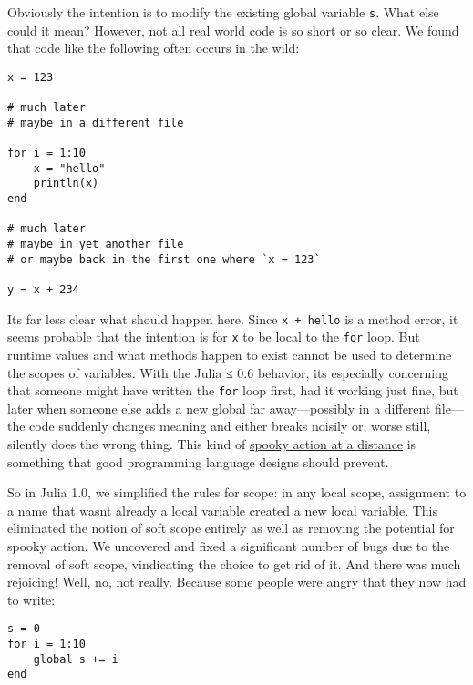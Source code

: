 Obviously the intention is to modify the existing global variable \texttt{s}. What else could it mean? However, not all real world code is so short or so clear. We found that code like the following often occurs in the wild:




\begin{verbatim}
x = 123

# much later
# maybe in a different file

for i = 1:10
    x = "hello"
    println(x)
end

# much later
# maybe in yet another file
# or maybe back in the first one where `x = 123`

y = x + 234
\end{verbatim}



It{\textquotesingle}s far less clear what should happen here. Since \texttt{x + {\textquotedbl}hello{\textquotedbl}} is a method error, it seems probable that the intention is for \texttt{x} to be local to the \texttt{for} loop. But runtime values and what methods happen to exist cannot be used to determine the scopes of variables. With the Julia ≤ 0.6 behavior, it{\textquotesingle}s especially concerning that someone might have written the \texttt{for} loop first, had it working just fine, but later when someone else adds a new global far away—possibly in a different file—the code suddenly changes meaning and either breaks noisily or, worse still, silently does the wrong thing. This kind of \href{https://en.wikipedia.org/wiki/Action\_at\_a\_distance\_(computer\_programming)}{{\textquotedbl}spooky action at a distance{\textquotedbl}} is something that good programming language designs should prevent.



So in Julia 1.0, we simplified the rules for scope: in any local scope, assignment to a name that wasn{\textquotesingle}t already a local variable created a new local variable. This eliminated the notion of soft scope entirely as well as removing the potential for spooky action. We uncovered and fixed a significant number of bugs due to the removal of soft scope, vindicating the choice to get rid of it. And there was much rejoicing! Well, no, not really. Because some people were angry that they now had to write:




\begin{verbatim}
s = 0
for i = 1:10
    global s += i
end
\end{verbatim}




